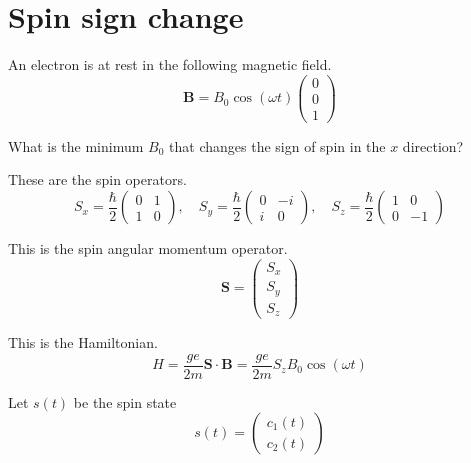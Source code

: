 


\section*{Spin sign change}

An electron is at rest in the following magnetic field.
\begin{equation*}
\mathbf B=B_0\cos(\omega t)\begin{pmatrix}0\\0\\1\end{pmatrix}
\end{equation*}

What is the minimum $B_0$ that changes the sign of spin in the $x$ direction?

\bigskip
These are the spin operators.
\begin{equation*}
S_x=\frac{\hbar}{2}\begin{pmatrix}0&1\\1&0\end{pmatrix},\quad
S_y=\frac{\hbar}{2}\begin{pmatrix}0&-i\\i&0\end{pmatrix},\quad
S_z=\frac{\hbar}{2}\begin{pmatrix}1&0\\0&-1\end{pmatrix}
\end{equation*}

This is the spin angular momentum operator.
\begin{equation*}
\mathbf S=\begin{pmatrix}S_x\\S_y\\S_z\end{pmatrix}
\end{equation*}

This is the Hamiltonian.
\begin{equation*}
H=\frac{ge}{2m}\mathbf S\cdot\mathbf B
=\frac{ge}{2m}S_zB_0\cos(\omega t)
\end{equation*}

Let $s(t)$ be the spin state
\begin{equation*}
s(t)=\begin{pmatrix}c_1(t)\\c_2(t)\end{pmatrix}
\end{equation*}

